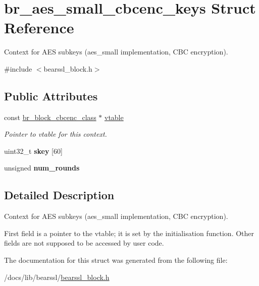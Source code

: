 \hypertarget{structbr__aes__small__cbcenc__keys}{}\section{br\+\_\+aes\+\_\+small\+\_\+cbcenc\+\_\+keys Struct Reference}
\label{structbr__aes__small__cbcenc__keys}


Context for A\+ES subkeys ({\ttfamily aes\+\_\+small} implementation, C\+BC encryption).  




{\ttfamily \#include $<$bearssl\+\_\+block.\+h$>$}

\subsection*{Public Attributes}
\begin{DoxyCompactItemize}
\item 
\mbox{\label{structbr__aes__small__cbcenc__keys_a6c9253c2ac9616fbeaca0738e196f2bc}} 
const \hyperlink{bearssl__block_8h_ad0ecff523e21a74dc1143dcfa52aa251}{br\+\_\+block\+\_\+cbcenc\+\_\+class} $\ast$ \hyperlink{structbr__aes__small__cbcenc__keys_a6c9253c2ac9616fbeaca0738e196f2bc}{vtable}
\begin{DoxyCompactList}\small\item\em Pointer to vtable for this context. \end{DoxyCompactList}\item 
\mbox{\label{structbr__aes__small__cbcenc__keys_a827b426394fd4c9cd65e38f8777e8f70}} 
uint32\+\_\+t {\bfseries skey} \mbox{[}60\mbox{]}
\item 
\mbox{\label{structbr__aes__small__cbcenc__keys_a43c871cc570e1b83ef0eb278ffdf39b2}} 
unsigned {\bfseries num\+\_\+rounds}
\end{DoxyCompactItemize}


\subsection{Detailed Description}
Context for A\+ES subkeys ({\ttfamily aes\+\_\+small} implementation, C\+BC encryption). 

First field is a pointer to the vtable; it is set by the initialisation function. Other fields are not supposed to be accessed by user code. 

The documentation for this struct was generated from the following file\+:\begin{DoxyCompactItemize}
\item 
/docs/lib/bearssl/\hyperlink{bearssl__block_8h}{bearssl\+\_\+block.\+h}\end{DoxyCompactItemize}
